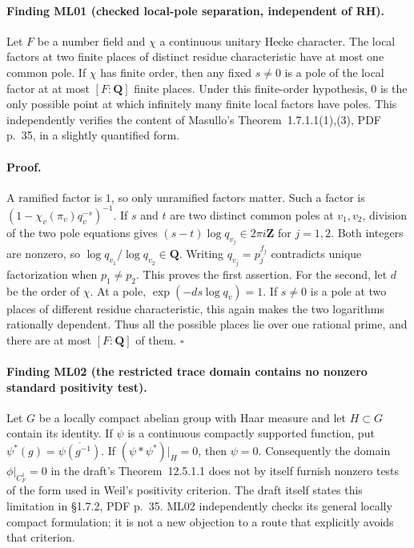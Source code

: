\documentclass[11pt,a4paper]{article}
\theoremstyle{definition}
\begin{document}
\paragraph{Finding ML01 (checked local-pole separation, independent of RH).}
Let $F$ be a number field and $\chi$ a continuous unitary Hecke character.
The local factors at two finite places of distinct residue characteristic
have at most one common pole. If $\chi$ has finite order, then any fixed
$s\ne0$ is a pole of the local factor at at most $[F:\mathbf Q]$ finite
places. Under this finite-order hypothesis, $0$ is the only possible
point at which infinitely many finite local factors have poles. This independently verifies the content
of Masullo's Theorem~1.7.1.1(1),(3), PDF p.~35, in a slightly quantified form.

\paragraph{Proof.}
A ramified factor is $1$, so only unramified factors matter. Such a factor
is $(1-\chi_v(\pi_v)q_v^{-s})^{-1}$. If $s$ and $t$ are two distinct common
poles at $v_1,v_2$, division of the two pole equations gives
$(s-t)\log q_{v_j}\in2\pi i\mathbf Z$ for $j=1,2$.
Both integers are nonzero, so $\log q_{v_1}/\log q_{v_2}\in\mathbf Q$.
Writing $q_{v_j}=p_j^{f_j}$ contradicts unique factorization when
$p_1\ne p_2$. This proves the first assertion.
For the second, let $d$ be the order of $\chi$. At a pole,
$\exp(-ds\log q_v)=1$. If $s\ne0$ is a pole at two places of different
residue characteristic, this again makes the two logarithms rationally
dependent. Thus all the possible places lie over one rational prime, and
there are at most $[F:\mathbf Q]$ of them. \hfill$\square$

\paragraph{Finding ML02 (the restricted trace domain contains no nonzero
standard positivity test).}
Let $G$ be a locally compact abelian group with Haar measure and let
$H\subset G$ contain its identity. If $\psi$ is a continuous compactly
supported function, put $\psi^*(g)=\overline{\psi(g^{-1})}$.
If $(\psi*\psi^*)|_H=0$, then $\psi=0$.
Consequently the domain $\phi|_{C_F^1}=0$ in the draft's
Theorem~12.5.1.1 does not by itself furnish nonzero tests of the form used
in Weil's positivity criterion.
The draft itself states this limitation in \S1.7.2, PDF p.~35.
ML02 independently checks its general locally compact formulation; it is
not a new objection to a route that explicitly avoids that criterion.
\end{document}
